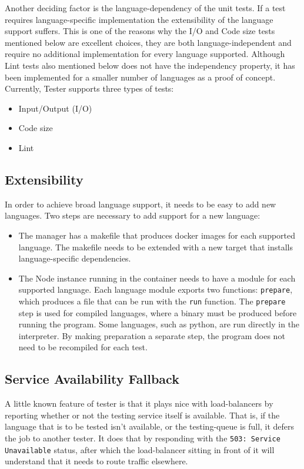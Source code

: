 Another deciding factor is the language-dependency of the unit tests. If a test requires language-specific implementation the extensibility of the language support suffers. This is one of the reasons why the I/O and Code size tests mentioned below are excellent choices, they are both language-independent and require no additional implementation for every language supported. Although Lint tests also mentioned below does not have the independency property, it has been implemented for a smaller number of languages as a proof of concept.
Currently, Tester supports three types of tests:
\begin{itemize}
\item Input/Output (I/O)
\item Code size
\item Lint
\end{itemize}


\subsection{Extensibility}
In order to achieve broad language support, it needs to be easy to add new languages. Two steps are necessary to add support for a new language:

\begin{itemize}
\item The manager has a makefile that produces docker images for each supported language. The makefile needs to be extended with a new target that installs language-specific dependencies.

\item The Node instance running in the container needs to have a module for each supported language. Each language module exports two functions: \texttt{prepare}, which produces a file that can be run with the \texttt{run} function. The \texttt{prepare} step is used for compiled languages, where a binary must be produced before running the program. Some languages, such as python, are run directly in the interpreter. By making preparation a separate step, the program does not need to be recompiled for each test.
\end{itemize}

\subsection{Service Availability Fallback}
A little known feature of tester is that it plays nice with load-balancers by reporting whether or not the testing service itself is available. That is, if the language that is to be tested isn't available, or the testing-queue is full, it defers the job to another tester. It does that by responding with the \texttt{503: Service Unavailable} status, after which the load-balancer sitting in front of it will understand that it needs to route traffic elsewhere.
